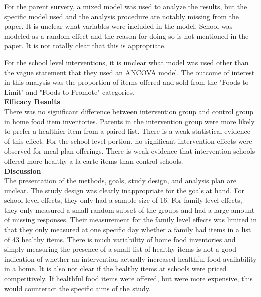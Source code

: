 \documentclass[11pt,a4paper]{article}
\begin{document}
For the parent survery, a mixed model was used to analyze the results, but the specific model used and the analysis procedure are notably missing from the paper. It is unclear what variables were included in the model. School was modeled as a random effect and the reason for doing so is not mentioned in the paper. It is not totally clear that this is appropriate.

For the school level interventions, it is unclear what model was used other than the vague statement that they used an ANCOVA model. The outcome of interest in this analysis was the proportion of items offered and sold from the "Foods to Limit" and "Foods to Promote" categories. \\

\textbf{Efficacy Results} \\
There was no significant difference between intervention group and control group in home food item inventories. Parents in the intervention group were more likely to prefer a healthier item from a paired list. There is a weak statistical evidence of this effect. For the school level portion, no significant intervention effects were observed for meal plan offerings. There is weak evidence that intervention schools offered more healthy a la carte items than control schools. \\

\textbf{Discussion} \\
The presentation of the methods, goals, study design, and analysis plan are unclear. The study design was clearly inappropriate for the goals at hand. For school level effects, they only had a sample size of 16. For family level effects, they only measured a small random subset of the groups and had a large amount of missing responses. Their measurement for the family level effects was limited in that they only measured at one specific day whether a family had items in a list of 43 healthy items. There is much variability of home food inventories and simply measuring the presence of a small list of healthy items is not a good indication of whether an intervention actually increased healthful food availability in a home. It is also not clear if the healthy items at schools were priced competitively. If healthful food items were offered, but were more expensive, this would counteract the specific aims of the study. 
 
\end{document}
